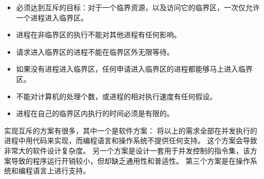 {{        \begin{itemize}
            \item 必须达到互斥的目标：对于一个临界资源，以及访问它的临界区，一次仅允许一个进程进入临界区。
            \item 进程在非临界区的执行不能对其他进程有任何影响。
            \item 请求进入临界区的进程不能在临界区外无限等待。
            \item 如果没有进程进入临界区，任何申请进入临界区的进程都能够马上进入临界区。
            \item 不能对计算机的处理个数，或进程的相对执行速度有任何假设。
            \item 进程在自己的临界区内执行的时间必须是有限的。
        \end{itemize}

        实现互斥的方案有很多，其中一个是软件方案：
        将以上的需求全部在并发执行的进程中用代码来实现，而编程语言和操作系统不提供任何支持。
        这个方案会导致非常大的软件设计复杂度。
        另一个方案是设计一套用于并发控制的指令集，该方案导致的程序运行开销较小，但却缺乏通用性和普适性。
        第三个方案是在操作系统和编程语言上进行支持。
    }
}
